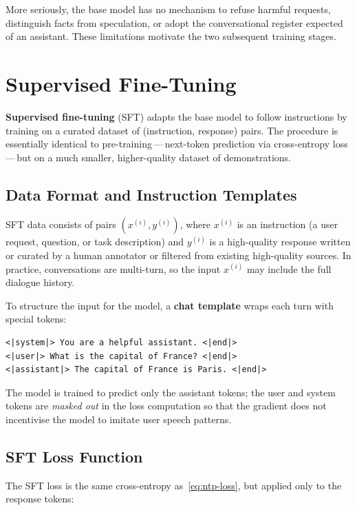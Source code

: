 More seriously, the base model has no mechanism to refuse harmful requests, distinguish facts from speculation, or adopt the conversational register expected of an assistant. These limitations motivate the two subsequent training stages.

\section{Supervised Fine-Tuning}
\label{sec:sft}

\textbf{Supervised fine-tuning} (SFT) adapts the base model to follow instructions by training on a curated dataset of (instruction, response) pairs. The procedure is essentially identical to pre-training\,---\,next-token prediction via cross-entropy loss\,---\,but on a much smaller, higher-quality dataset of demonstrations.

\subsection{Data Format and Instruction Templates}

SFT data consists of pairs $(x^{(i)}, y^{(i)})$, where $x^{(i)}$ is an instruction (a user request, question, or task description) and $y^{(i)}$ is a high-quality response written or curated by a human annotator or filtered from existing high-quality sources. In practice, conversations are multi-turn, so the input $x^{(i)}$ may include the full dialogue history.

To structure the input for the model, a \textbf{chat template} wraps each turn with special tokens:
\begin{verbatim}
<|system|> You are a helpful assistant. <|end|>
<|user|> What is the capital of France? <|end|>
<|assistant|> The capital of France is Paris. <|end|>
\end{verbatim}
The model is trained to predict only the assistant tokens; the user and system tokens are \emph{masked out} in the loss computation so that the gradient does not incentivise the model to imitate user speech patterns.

\subsection{SFT Loss Function}

The SFT loss is the same cross-entropy as~\eqref{eq:ntp-loss}, but applied only to the response tokens:

